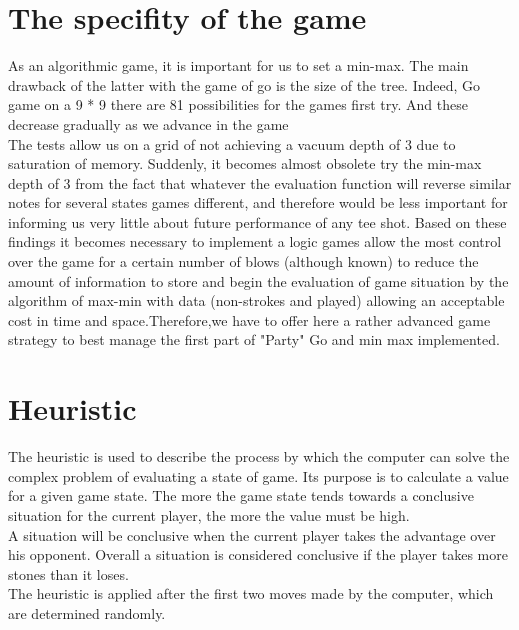 \documentclass{report}
\begin{document}
\section* {The specifity of the game}

As an algorithmic game, it is important for us to set a min-max. The
main drawback of the latter with the game of go is the size of the tree. Indeed,
Go game on a 9 * 9 there are 81 possibilities for the games first try. And these
decrease gradually as we advance in the game\\
The tests allow us on a grid of not achieving a vacuum
depth of 3 due to saturation of memory. Suddenly, it becomes almost
obsolete try the min-max depth of 3 from the fact that whatever the
evaluation function will reverse similar notes for several states games
different, and therefore would be less important for informing us very little about
future performance of any tee shot.
Based on these findings it becomes necessary to implement a logic games
allow the most control over the game for a certain number of blows (although
known) to reduce the amount of information to store and begin the evaluation of
game situation by the algorithm of max-min with data (non-strokes and played)
allowing an acceptable cost in time and space.Therefore,we have to offer here
a rather advanced game strategy to best manage the first part of
"Party" Go and min max implemented.\\


\section{Heuristic}


The heuristic is used to describe the process by which the computer can solve the complex problem of evaluating a state of game.
Its purpose is to calculate a value for a given game state. The more the game state tends towards a conclusive situation for the current player, the more the value must be high.\\

A situation will be conclusive when the current player takes the advantage over his opponent.
Overall a situation is considered conclusive if the player takes more stones than it loses.\\

The heuristic is applied after the first two moves made by the computer, which are determined randomly.\\
\newpage
\end{document}
